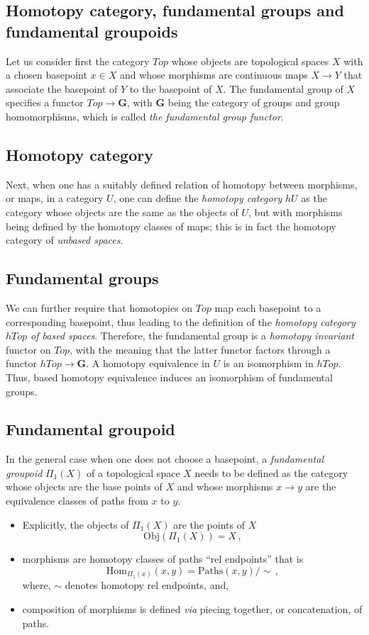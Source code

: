 \documentclass[12pt]{article}
\theoremstyle{plain}
\theoremstyle{definition}
\numberwithin{equation}{section}
\begin{document}
\subsection{Homotopy category, fundamental groups and fundamental groupoids}

  Let us consider first the category \textbf{$Top$} whose objects are topological spaces $X$ with a chosen 
basepoint $x \in X$ and whose morphisms are continuous maps $X \to Y$ that associate the basepoint of $Y$ to the
basepoint of $X$. The fundamental group of $X$ specifies a functor $Top \to \textbf{G}$,
with $\textbf{G}$ being the category of groups and group homomorphisms, which is called 
\emph{the fundamental group functor}. 

\subsection{Homotopy category}
  Next, when one has a suitably defined relation of homotopy between morphisms, or maps, in a category \textbf{$U$}, one can define the \emph{homotopy category} $hU$ as the category whose objects are the same as the objects of \textbf{$U$}, but with morphisms being defined by the homotopy classes of maps; this is in fact the homotopy category of \emph{unbased spaces}. 

\subsection{Fundamental groups}
 We can further require that homotopies on \textbf{$Top$} map each basepoint to a corresponding basepoint, thus leading to the definition of the \emph{homotopy category $hTop$ of based spaces}. Therefore, the fundamental group is a \emph{homotopy invariant} functor on \textbf{$Top$}, with the meaning that the latter functor factors through a functor $ hTop \to \textbf{G} $. A homotopy equivalence in \textbf{$U$} is an isomorphism in $hTop$. Thus, based homotopy equivalence induces an isomorphism of fundamental groups. 

\subsection{Fundamental groupoid}
 In the general case when one does not choose a basepoint, a \emph{fundamental groupoid}
$\Pi_1 (X)$ of a topological space $X$ needs to be defined as the category whose objects are
the base points of $X$ and whose morphisms $x \to y$ are the equivalence classes of paths from $x$ to $y$.
\begin{itemize}
\item Explicitly, the objects of $\Pi_1(X)$ are the points of $X$
$$\mathrm{Obj}(\Pi_1(X))=X\,,$$
\item morphisms are homotopy classes of paths ``rel endpoints'' that is
$$\mathrm{Hom}_{\Pi_1(x)}(x,y)=\mathrm{Paths}(x,y)/\sim\, ,$$
where, $\sim$ denotes homotopy rel endpoints, and,
\item composition of morphisms is defined \emph{via} piecing together, or concatenation, of paths.
\end{itemize}
\end{document}
